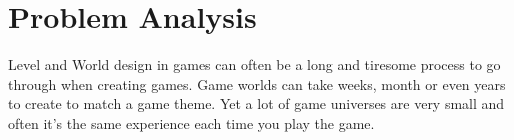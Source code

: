 \section{Problem Analysis}

Level and World design in games can often be a long and tiresome process to go through when creating games. Game worlds can take weeks, month or even years to create  to match a game theme. Yet a lot of game universes are very small and often it’s the same experience each time you play the game.

